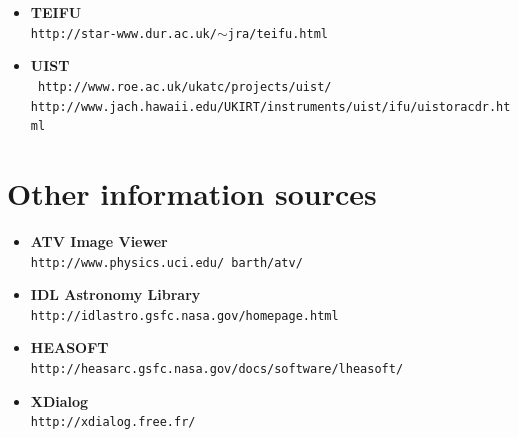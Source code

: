 \documentclass[twoside,11pt]{article}
\newcommand{\htmladdnormallink}[2]{#1}
\newcommand{\xlabel}[1]{}
\begin{document}
{\begin{small}
\begin{itemize}
\item {\bf\label{sc16_available_teifu}TEIFU}\\
\htmladdnormallink{{\tt http://star-www.dur.ac.uk/$\sim$jra/teifu.html}}{http://star-www.dur.ac.uk/~jra/teifu.html}

\item {\bf\label{sc16_available_uist}UIST}\\
\htmladdnormallink{{\tt
http://www.roe.ac.uk/ukatc/projects/uist/}}{http://www.roe.ac.uk/ukatc/projects/uist/}\\
\htmladdnormallink{{\tt http://www.jach.hawaii.edu/UKIRT/instruments/uist/ifu/uistoracdr.html}}{http://www.jach.hawaii.edu/UKIRT/instruments/uist/ifu/uistoracdr.html}

\end{itemize}
\end{small}

\section{\xlabel{sc16_sources}Other information sources\label{sc16_sources}}

\begin{small}
\begin{itemize}


\item {\bf\label{sc16_sources_atv}ATV Image Viewer}\\
\htmladdnormallink{{\tt http://www.physics.uci.edu/~barth/atv/}}{http://www.physics.uci.edu/~barth/atv/}

\item {\bf\label{sc16_sources_fitsidl}IDL Astronomy Library}\\
\htmladdnormallink{{\tt http://idlastro.gsfc.nasa.gov/homepage.html}}{http://idlastro.gsfc.nasa.gov/homepage.html}

\item {\bf\label{sc16_sources_heasoft}HEASOFT}\\
\htmladdnormallink{{\tt http://heasarc.gsfc.nasa.gov/docs/software/lheasoft/}}{http://heasarc.gsfc.nasa.gov/docs/software/lheasoft/}

\item {\bf\label{sc16_sources_xdialog}XDialog}\\
\htmladdnormallink{{\tt http://xdialog.free.fr/}}{http://xdialog.free.fr/}


\end{itemize}
\end{small}}
\end{document}
